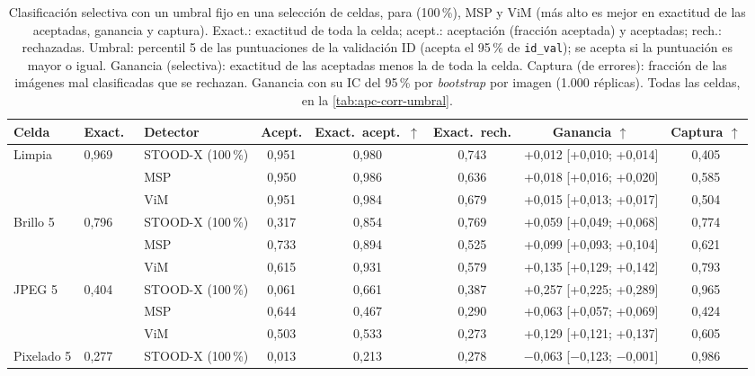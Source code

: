\begin{table}[tbp]
\centering
\scriptsize
\setlength{\tabcolsep}{2.5pt}
\caption{Clasificación selectiva con un umbral fijo en una selección de celdas, para \stoodx (100\,\%), MSP y ViM (más alto es mejor en exactitud de las aceptadas, ganancia y captura). Exact.: exactitud de toda la celda; acept.: aceptación (fracción aceptada) y aceptadas; rech.: rechazadas. Umbral: percentil 5 de las puntuaciones de la validación ID (acepta el 95\,\% de \texttt{id\_val}); se acepta si la puntuación es mayor o igual. Ganancia (selectiva): exactitud de las aceptadas menos la de toda la celda. Captura (de errores): fracción de las imágenes mal clasificadas que se rechazan. Ganancia con su IC del 95\,\% por \emph{bootstrap} por imagen (1.000 réplicas). Todas las celdas, en la \cref{tab:apc-corr-umbral}.}
\label{tab:ood-corr-umbral}
\begin{tabular}{lllccccc}
\toprule
Celda & Exact.\ & Detector & Acept. & Exact.\ acept.\ $\uparrow$ & Exact.\ rech. & Ganancia $\uparrow$ & Captura $\uparrow$ \\
\midrule
Limpia & 0{,}969 & STOOD-X (100\,\%) & 0{,}951 & 0{,}980 & 0{,}743 & +0{,}012 {\tiny [+0{,}010; +0{,}014]} & 0{,}405 \\
 &  & MSP & 0{,}950 & 0{,}986 & 0{,}636 & +0{,}018 {\tiny [+0{,}016; +0{,}020]} & 0{,}585 \\
 &  & ViM & 0{,}951 & 0{,}984 & 0{,}679 & +0{,}015 {\tiny [+0{,}013; +0{,}017]} & 0{,}504 \\
\midrule
Brillo 5 & 0{,}796 & STOOD-X (100\,\%) & 0{,}317 & 0{,}854 & 0{,}769 & +0{,}059 {\tiny [+0{,}049; +0{,}068]} & 0{,}774 \\
 &  & MSP & 0{,}733 & 0{,}894 & 0{,}525 & +0{,}099 {\tiny [+0{,}093; +0{,}104]} & 0{,}621 \\
 &  & ViM & 0{,}615 & 0{,}931 & 0{,}579 & +0{,}135 {\tiny [+0{,}129; +0{,}142]} & 0{,}793 \\
\midrule
JPEG 5 & 0{,}404 & STOOD-X (100\,\%) & 0{,}061 & 0{,}661 & 0{,}387 & +0{,}257 {\tiny [+0{,}225; +0{,}289]} & 0{,}965 \\
 &  & MSP & 0{,}644 & 0{,}467 & 0{,}290 & +0{,}063 {\tiny [+0{,}057; +0{,}069]} & 0{,}424 \\
 &  & ViM & 0{,}503 & 0{,}533 & 0{,}273 & +0{,}129 {\tiny [+0{,}121; +0{,}137]} & 0{,}605 \\
\midrule
Pixelado 5 & 0{,}277 & STOOD-X (100\,\%) & 0{,}013 & 0{,}213 & 0{,}278 & $-$0{,}063 {\tiny [$-$0{,}123; $-$0{,}001]} & 0{,}986 \\

\end{tabular}
\end{table}
